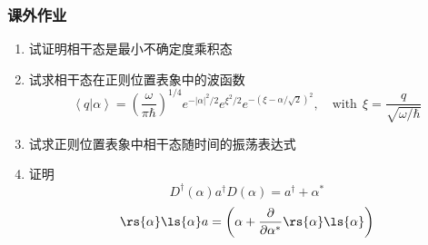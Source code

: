 \begin{frame}
    \frametitle{课外作业}
    \begin{enumerate}
        \item 试证明相干态是最小不确定度乘积态
        \item 试求相干态在正则位置表象中的波函数
        \[\left\langle q| \alpha \right\rangle = ( \frac{\omega}{\pi \hbar})^{1/4} e^{-|\alpha|^2 /2} e^{\xi^2 /2} e^{-(\xi - \alpha/\sqrt{2})^2}  , \quad \text{with}~~ \xi= \frac{q}{\sqrt{\omega/\hbar}}\]
        \item 试求正则位置表象中相干态随时间的振荡表达式
        \item 证明
        \[D^\dagger (\alpha) a^\dagger D (\alpha) = a^\dagger + \alpha^* \]
        \[ \rs{\alpha }\ls{\alpha } a= \left( \alpha + \frac{\partial }{\partial \alpha^*} \rs{\alpha }\ls{\alpha } \right)\]
    \end{enumerate}
\end{frame}

